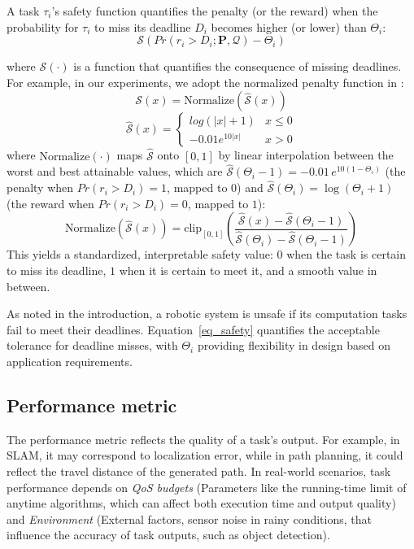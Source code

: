 	\begin{definition}
		A task $\tau_i$'s safety function quantifies the penalty (or the reward) when the probability for $\tau_i$ to miss its deadline $D_i$ becomes higher (or lower) than $\Theta_i$:
		\begin{equation}
			\mathcal{S}(Pr(r_i > D_i ; \boldsymbol{P}, \boldsymbol{\mathcal{Q}}) - \Theta_i)
			\label{eq_safety_function}
		\end{equation}
	\end{definition}
	where $\mathcal{S}(\cdot)$ is a function that quantifies the consequence of missing deadlines.
    For example, in our experiments, we adopt the normalized penalty function in \cite{Ash23RAL}:
	\begin{equation}
		\mathcal{S}(x)  = \text{Normalize}(\hat{\mathcal{S}}(x))
	\end{equation}
	\begin{equation}
		\hat{\mathcal{S}}(x) = \begin{cases}
			log(|x|+1) & x \leq 0 \\
			-0.01 e^{10|x|}  & x > 0
		\end{cases}
	\end{equation}
	where $\text{Normalize}(\cdot)$ maps $\hat{\mathcal{S}}$ onto $[0,1]$ by linear interpolation between the worst and best attainable values, which are $\hat{\mathcal{S}}(\Theta_i - 1) = -0.01\,e^{10(1-\Theta_i)}$ (the penalty when $Pr(r_i > D_i) = 1$, mapped to $0$) and $\hat{\mathcal{S}}(\Theta_i) = \log(\Theta_i + 1)$ (the reward when $Pr(r_i > D_i) = 0$, mapped to $1$):
	\begin{equation}
		\text{Normalize}(\hat{\mathcal{S}}(x)) = \mathrm{clip}_{[0,1]}\!\left( \frac{\hat{\mathcal{S}}(x) - \hat{\mathcal{S}}(\Theta_i - 1)}{\hat{\mathcal{S}}(\Theta_i) - \hat{\mathcal{S}}(\Theta_i - 1)} \right)
		\label{eq_normalize}
	\end{equation}
    This yields a standardized, interpretable safety value: $0$ when the task is certain to miss its deadline, $1$ when it is certain to meet it, and a smooth value in between.

    As noted in the introduction, a robotic system is unsafe if its computation tasks fail to meet their deadlines.
    Equation~\eqref{eq_safety} quantifies the acceptable tolerance for deadline misses, with $\Theta_i$ providing flexibility in design based on application requirements.

	\subsection{Performance metric}
	The performance metric reflects the quality of a task’s output.
    For example, in SLAM, it may correspond to localization error, while in path planning, it could reflect the travel distance of the generated path.
    In real-world scenarios, task performance depends on \textit{QoS budgets} (Parameters like the running-time limit of anytime algorithms, which can affect both execution time and output quality) and \textit{Environment} (External factors, \eg sensor noise in rainy conditions, that influence the accuracy of task outputs, such as object detection).

